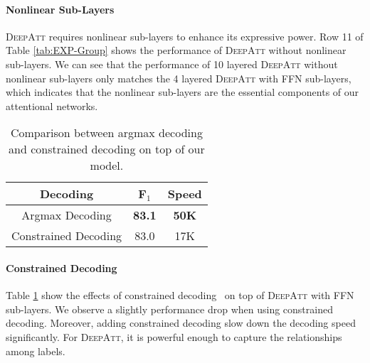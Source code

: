 \documentclass[letterpaper]{article} \usepackage{aaai18}  \usepackage{times}  \usepackage{helvet}  \usepackage{courier}  \usepackage{url}  \usepackage{graphicx}  \frenchspacing  \setlength{\pdfpagewidth}{8.5in}  \setlength{\pdfpageheight}{11in}  \usepackage{latexsym}
\begin{document}
\paragraph{Nonlinear Sub-Layers} \textsc{DeepAtt} requires nonlinear sub-layers to enhance its expressive power. Row 11 of Table \ref{tab:EXP-Group} shows the performance of \textsc{DeepAtt} without nonlinear sub-layers. We can see that the performance of 10 layered \textsc{DeepAtt} without nonlinear sub-layers only matches the 4 layered \textsc{DeepAtt} with FFN sub-layers, which indicates that the nonlinear sub-layers are the essential components of our attentional networks.

\begin{table}[!t]
\centering
\begin{tabular}{c|cc}
Decoding & F$_1$ & Speed \\\hline
Argmax Decoding & \textbf{83.1} & \textbf{50K} \\
Constrained Decoding & 83.0 & 17K
\end{tabular}
\caption{Comparison between argmax decoding and constrained decoding on top of our model.}
\label{EXP:Decoding}
\end{table}

\paragraph{Constrained Decoding} Table \ref{EXP:Decoding} show the effects of constrained decoding~\cite{he2017deep} on top of \textsc{DeepAtt} with FFN sub-layers. We observe a slightly performance drop when using constrained decoding. Moreover, adding constrained decoding slow down the decoding speed significantly. For \textsc{DeepAtt}, it is powerful enough to capture the relationships among labels.
\end{document}
